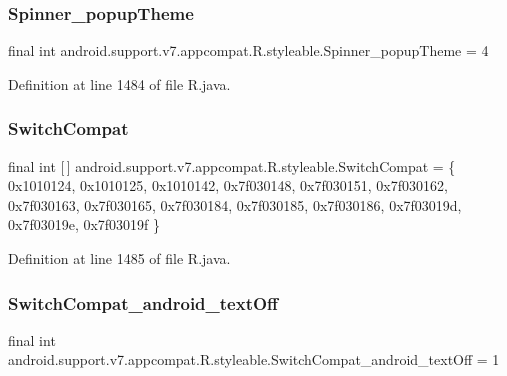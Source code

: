 \subsubsection{\texorpdfstring{Spinner\_popupTheme}{Spinner\_popupTheme}}
{\footnotesize\ttfamily final int android.\+support.\+v7.\+appcompat.\+R.\+styleable.\+Spinner\+\_\+popup\+Theme = 4\hspace{0.3cm}{\ttfamily [static]}}



Definition at line 1484 of file R.\+java.

\mbox{\label{classandroid_1_1support_1_1v7_1_1appcompat_1_1_r_1_1styleable_aabe688560752254f2288f3eaf9439737}} 
\subsubsection{\texorpdfstring{SwitchCompat}{SwitchCompat}}
{\footnotesize\ttfamily final int \mbox{[}$\,$\mbox{]} android.\+support.\+v7.\+appcompat.\+R.\+styleable.\+Switch\+Compat = \{ 0x1010124, 0x1010125, 0x1010142, 0x7f030148, 0x7f030151, 0x7f030162, 0x7f030163, 0x7f030165, 0x7f030184, 0x7f030185, 0x7f030186, 0x7f03019d, 0x7f03019e, 0x7f03019f \}\hspace{0.3cm}{\ttfamily [static]}}



Definition at line 1485 of file R.\+java.

\mbox{\label{classandroid_1_1support_1_1v7_1_1appcompat_1_1_r_1_1styleable_ad9b521772e16cac1f87dfe01701ec275}} 
\subsubsection{\texorpdfstring{SwitchCompat\_android\_textOff}{SwitchCompat\_android\_textOff}}
{\footnotesize\ttfamily final int android.\+support.\+v7.\+appcompat.\+R.\+styleable.\+Switch\+Compat\+\_\+android\+\_\+text\+Off = 1\hspace{0.3cm}{\ttfamily [static]}}



